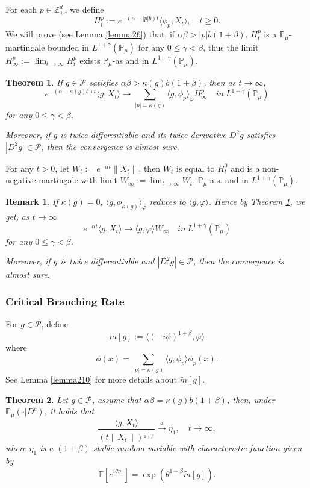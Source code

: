 \documentclass{article}
\newtheorem{remark}{Remark}[section]
\newtheorem{theorem}{Theorem}[section]
\begin{document}
For each $p\in \mathbb{Z}_+^d$, we define 
$$H_t^p:= e^{-(\alpha-|p|b)t}\langle\phi_p,X_t\rangle,\quad t\geq 0.$$
 We will prove (see Lemma \ref{lemma26}) that, if $\alpha\beta>|p|b(1+\beta)$, $H_t^p$ is a $\mathbb{P}_{\mu}$-martingale bounded in $L^{1+\gamma}(\mathbb{P}_{\mu})$ for any $0\leq\gamma<\beta$, thus the limit $H^p_{\infty}:=\lim_{t\rightarrow \infty}H_t^p$ exists $\mathbb{P}_{\mu}$-as and in $L^{1+\gamma}(\mathbb{P}_{\mu})$.
 \begin{theorem}\label{Theorem11}
     If $g \in \mathcal{P}$ satisfies $\alpha\beta>\kappa(g)b(1+\beta)$, then as $t\rightarrow \infty$,
     $$e^{-(\alpha-\kappa(g)b)t}\langle g, X_t\rangle \rightarrow\sum_{|p|=\kappa(g)}\langle g, \phi_p\rangle_{\varphi} H_{\infty}^p \quad in~ L^{1+\gamma}(\mathbb{P}_{\mu})$$
     for any $0\leq\gamma<\beta$.
     
     Moreover, if $g$ is twice differentiable and its twice derivative $D^2 g$ satisfies $|D^2 g| \in \mathcal{P}$, then the convergence is almost sure. 
 \end{theorem}
For any $t>0$, let $W_t:=e^{-\alpha t}\|X_t\|$, then $W_t$ is equal to $H_t^0$ and is a non-negative martingale with limit $W_{\infty}:=\lim_{t\rightarrow\infty}W_t$,  $\mathbb{P}_{\mu}$-a.s. and in $L^{1+\gamma}(\mathbb{P}_{\mu})$.  
 \begin{remark}
    If $\kappa(g)=0$, $\langle g, \phi_{\kappa(g)}\rangle_{\varphi}$ reduces to $\langle g,\varphi\rangle$. Hence by Theorem \ref{Theorem11}, we get, as $t\rightarrow \infty$
     $$e^{-\alpha t}\langle g, X_t\rangle \rightarrow \langle g, \varphi\rangle W_{\infty} \quad in~ L^{1+\gamma}(\mathbb{P}_{\mu})$$
    for any $0\leq\gamma<\beta$.
    
    Moreover, if $g$ is twice differentiable and $|D^2 g| \in \mathcal{P}$, then the convergence is almost sure. 
 \end{remark}

\subsubsection{Critical Branching Rate}
For $g\in \mathcal{P}$, define 
$$\tilde{m}[g]:= \langle(-i\phi)^{1+\beta},\varphi\rangle$$
{\color{red}where} 
$$\phi(x)=\sum_{|p|=\kappa(g)}\langle g,\phi_p\rangle\phi_p(x).$$
See Lemma \ref{lemma210} for more details about $\tilde{m}[g]$.
\begin{theorem}\label{Theorem12}
Let $g\in\mathcal{P}$, assume that  $\alpha\beta=\kappa(g)b(1+\beta)$, then, under $\mathbb{P}_{\mu}(\cdot|D^c)$, it holds that
$$\frac{\langle g,X_t\rangle}{\left(t\|X_t\|\right)^{\frac{1}{1+\beta}}}\xrightarrow{d} \eta_1, \quad t\rightarrow \infty,$$
where $\eta_1$ is a $(1+\beta)$-stable random variable with characteristic function given by 
$$\mathbb{E} [e^{i\theta \eta_1}]=\exp(\theta^{1+\beta}\tilde{m}[g]).$$
\end{theorem}
\end{document}
